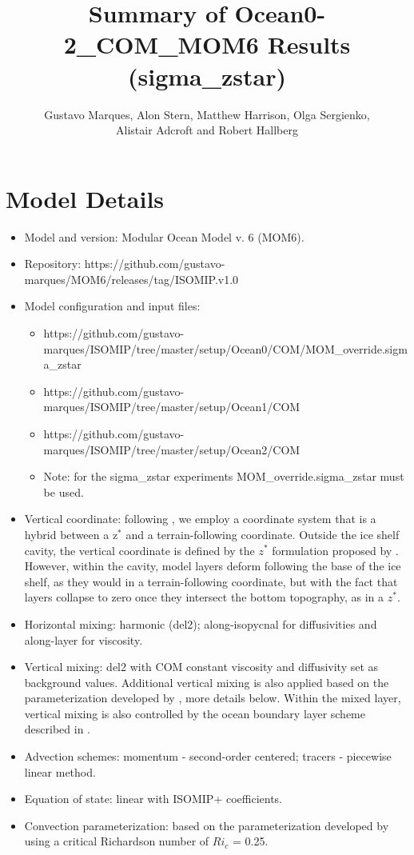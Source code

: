 \documentclass[11pt]{article} %
\title{Summary of Ocean0-2\_COM\_MOM6 Results (sigma\_zstar)}
\author{Gustavo Marques, Alon Stern, Matthew Harrison, Olga Sergienko, \\ Alistair Adcroft and Robert Hallberg}
\begin{document}
\maketitle

\section{Model Details}

\begin{itemize}
\item Model and version: Modular Ocean Model v. 6 (MOM6).
\item Repository: https://github.com/gustavo-marques/MOM6/releases/tag/ISOMIP.v1.0 
\item Model configuration and input files: 
\begin{itemize}
   \item https://github.com/gustavo-marques/ISOMIP/tree/master/setup/Ocean0/COM/MOM\_override.sigma\_zstar
   \item https://github.com/gustavo-marques/ISOMIP/tree/master/setup/Ocean1/COM
   \item https://github.com/gustavo-marques/ISOMIP/tree/master/setup/Ocean2/COM
   \item Note: for the sigma\_zstar experiments MOM\_override.sigma\_zstar must be used.
\end{itemize}
\item Vertical coordinate: following \cite{Stern2017}, we employ a coordinate system that is a hybrid between a z$^*$ and a terrain-following coordinate. Outside the ice shelf cavity, the vertical coordinate is defined by the $z^*$ formulation proposed by \cite{Adcroft2004}. However, within the cavity, model layers deform following the base of the ice shelf, as they would in a terrain-following coordinate, but with the fact that layers collapse to zero once they intersect the bottom topography, as in a $z^*$.
\item Horizontal mixing: harmonic (del2); along-isopycnal for diffusivities and along-layer for viscosity.
\item Vertical mixing: del2 with COM constant viscosity and diffusivity set as background values. Additional vertical mixing is also applied based on the parameterization developed by \cite{Jackson2008}, more details below. Within the mixed layer, vertical mixing is also controlled by the ocean boundary layer scheme described in \cite{Reichl2018}.
\item Advection schemes: momentum - second-order centered; tracers - piecewise linear method.
\item Equation of state: linear with ISOMIP+ coefficients.
\item Convection parameterization: based on the parameterization developed by \cite{Jackson2008} using a critical Richardson number of $Ri_c$ = 0.25.


\end{itemize}
\end{document}
